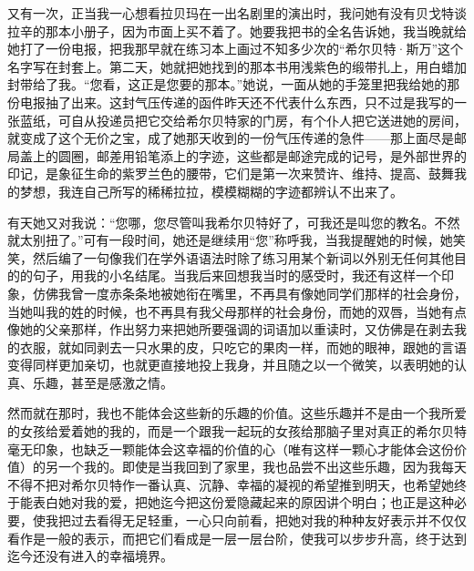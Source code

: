 \par 又有一次，正当我一心想看拉贝玛在一出名剧里的演出时，我问她有没有贝戈特谈拉辛的那本小册子，因为市面上买不着了。她要我把书的全名告诉她，我当晚就给她打了一份电报，把我那早就在练习本上画过不知多少次的“希尔贝特·斯万”这个名字写在封套上。第二天，她就把她找到的那本书用浅紫色的缎带扎上，用白蜡加封带给了我。“您看，这正是您要的那本。”她说，一面从她的手笼里把我给她的那份电报抽了出来。这封气压传递的函件昨天还不代表什么东西，只不过是我写的一张蓝纸，可自从投递员把它交给希尔贝特家的门房，有个仆人把它送进她的房间，就变成了这个无价之宝，成了她那天收到的一份气压传递的急件——那上面尽是邮局盖上的圆圈，邮差用铅笔添上的字迹，这些都是邮途完成的记号，是外部世界的印记，是象征生命的紫罗兰色的腰带，它们是第一次来赞许、维持、提高、鼓舞我的梦想，我连自己所写的稀稀拉拉，模模糊糊的字迹都辨认不出来了。
\par 有天她又对我说：“您哪，您尽管叫我希尔贝特好了，可我还是叫您的教名。不然就太别扭了。”可有一段时间，她还是继续用“您”称呼我，当我提醒她的时候，她笑笑，然后编了一句像我们在学外语语法时除了练习用某个新词以外别无任何其他目的的句子，用我的小名结尾。当我后来回想我当时的感受时，我还有这样一个印象，仿佛我曾一度赤条条地被她衔在嘴里，不再具有像她同学们那样的社会身份，当她叫我的姓的时候，也不再具有我父母那样的社会身份，而她的双唇，当她有点像她的父亲那样，作出努力来把她所要强调的词语加以重读时，又仿佛是在剥去我的衣服，就如同剥去一只水果的皮，只吃它的果肉一样，而她的眼神，跟她的言语变得同样更加亲切，也就更直接地投上我身，并且随之以一个微笑，以表明她的认真、乐趣，甚至是感激之情。
\par 然而就在那时，我也不能体会这些新的乐趣的价值。这些乐趣并不是由一个我所爱的女孩给爱着她的我的，而是一个跟我一起玩的女孩给那脑子里对真正的希尔贝特毫无印象，也缺乏一颗能体会这幸福的价值的心（唯有这样一颗心才能体会这份价值）的另一个我的。即使是当我回到了家里，我也品尝不出这些乐趣，因为我每天不得不把对希尔贝特作一番认真、沉静、幸福的凝视的希望推到明天，也希望她终于能表白她对我的爱，把她迄今把这份爱隐藏起来的原因讲个明白；也正是这种必要，使我把过去看得无足轻重，一心只向前看，把她对我的种种友好表示并不仅仅看作是一般的表示，而把它们看成是一层一层台阶，使我可以步步升高，终于达到迄今还没有进入的幸福境界。
